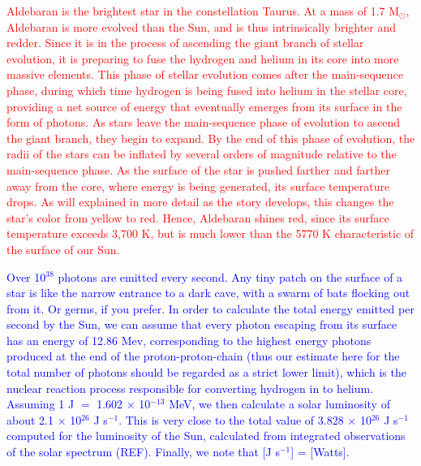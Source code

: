 \documentclass[main.tex]{subfiles}
\begin{document}
\begin{tcolorbox}[sharp corners, colback=red!30, colframe=red!80!blue, title=Aldebaran$^4$]
\par \textcolor{red} {Aldebaran is the brightest star in the constellation Taurus.  At a mass of 1.7 M$_{\odot}$, Aldebaran is more evolved than the Sun, and is thus intrinsically brighter and redder.  Since it is in the process of ascending the giant branch of stellar evolution, it is preparing to fuse the hydrogen and helium in its core into more massive elements.  This phase of stellar evolution comes after the main-sequence phase, during which time hydrogen is being fused into helium in the stellar core, providing a net source of energy that eventually emerges from its surface in the form of photons.   As stars leave the main-sequence phase of evolution to ascend the giant branch, they begin to expand.  By the end of this phase of evolution, the radii of the stars can be inflated by several orders of magnitude relative to the main-sequence phase.  As the surface of the star is pushed farther and farther away from the core, where energy is being generated, its surface temperature drops.  As will explained in more detail as the story develops, this changes the star's color from yellow to red.  Hence, Aldebaran shines red, since its surface temperature exceeds 3,700 K, but is much lower than the 5770 K characteristic of the surface of our Sun.}
\end{tcolorbox}

\begin{tcolorbox}[sharp corners, colback=blue!30, colframe=blue!80!blue, title=Stellar luminosity$^5$]
\par \textcolor{blue} {Over 10$^{38}$ photons are emitted every second.  Any tiny patch on the surface of a star is like the narrow entrance to a dark cave, with a swarm of bats flocking out from it.  Or germs, if you prefer.  In order to calculate the total energy emitted per second by the Sun, we can assume that every photon escaping from its surface has an energy of 12.86 Mev, corresponding to the highest energy photons produced at the end of the proton-proton-chain (thus our estimate here for the total number of photons should be regarded as a strict lower limit), which is the nuclear reaction process responsible for converting hydrogen in to helium.  Assuming 1 J $=$ 1.602 $\times$ 10$^{-13}$ MeV, we then calculate a solar luminosity of about 2.1 ${\times}$ 10$^{26}$ J s$^{-1}$.  This is very close to the total value of 3.828 $\times$ 10$^{26}$ J s$^{-1}$ computed for the luminosity of the Sun, calculated from integrated observations of the solar spectrum (REF). Finally, we note that [J s$^{-1}$] = [Watts].}  
\end{tcolorbox}
\end{document}
